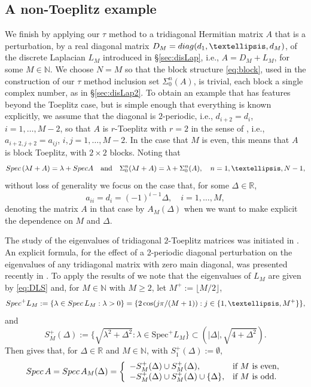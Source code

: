 \documentclass[preprint,1p,11pt]{elsarticle}
\newcommand\N{{\mathbb N}}
\newcommand\R{{\mathbb R}}
\newcommand\Spec{{\rm Spec}\,}  %
\newcommand\Specn{{\rm Spec}}   %
\newcommand\diag{{\rm diag}}
\numberwithin{equation}{section}   %
\numberwithin{figure}{section}  %
\begin{document}
\subsection{A non-Toeplitz example} \label{sec:2T}
We finish by applying our $\tau$ method to a tridiagonal Hermitian matrix $A$ that is a perturbation, by a real diagonal matrix $D_M= \diag(d_1,\ldots,d_M)$, of the discrete Laplacian $L_M$ introduced in \S\ref{sec:disLap}, i.e., $A=D_M+L_M$, for some $M\in \N$. We choose $N=M$ so that the block structure \eqref{eq:block}, used in the construction of our $\tau$ method inclusion set $\Sigma_0^n(A)$, is trivial, each block a single complex number, as in \S\ref{sec:disLap2}. To obtain an example that has features beyond the Toeplitz case, but is simple enough that everything is known explicitly, we assume that the diagonal is $2$-periodic, i.e., $d_{i+2}=d_i$, $i=1,\ldots,M-2$, so that $A$ is $r$-Toeplitz with $r=2$ in the sense of \cite{GoverBarnett85}, i.e., $a_{i+2,j+2}=a_{ij}$, $i,j=1,\ldots,M-2$. In the case that $M$ is even, this means that $A$ is block Toeplitz, with $2\times 2$ blocks. Noting that 
$$
\Spec(\lambda I + A) = \lambda + \Specn A \quad  \mbox{and} \quad \Sigma_0^n(\lambda I + A) = \lambda + \Sigma_0^n(A), \quad n=1,\ldots, N-1,
$$ 
without loss of generality we focus on the case that, for some $\Delta\in \R$, 
$$
a_{ii}=d_i = (-1)^{i-1}\Delta, \quad i=1,\ldots,M,
$$
denoting the matrix $A$ in that case by $A_M(\Delta)$ when we want to make explicit the dependence on $M$ and $\Delta$.

The study of the eigenvalues of tridiagonal $2$-Toeplitz matrices was initiated in \cite{Gover94}. An explicit formula, for the effect of a 2-periodic diagonal perturbation on the eigenvalues of any tridiagonal matrix with zero main diagonal, was presented recently in \cite{DyachenkoTyaglov24}. To apply the results of \cite{DyachenkoTyaglov24} we note that the eigenvalues of $L_M$ are given by \eqref{eq:DLS} and, for $M\in \N$ with $M\geq 2$, let $M^+:=\lfloor M/2\rfloor$,
$$
\Specn^+ L_M := \{\lambda\in \Spec L_M:\lambda>0\}=\{2 \cos(j\pi/(
M+ 1)) : j \in \{1, \ldots, M^+\}\},
$$
and
\begin{equation} \label{eq:SN+}
S_M^+(\Delta):= \{\sqrt{\lambda^2+\Delta^2}:\lambda\in \mathrm{Spec}^+L_M \}\subset \left(|\Delta|,\sqrt{4+\Delta^2}\right).
\end{equation}
Then  \cite[Theorem 3.1]{DyachenkoTyaglov24} gives that, for $\Delta\in \R$ and $M\in \N$, with $S^+_1(\Delta):= \emptyset$,
\begin{equation} \label{eq:spec2p}
\Spec A = \Spec A_M(\Delta) = \left\{\begin{array}{ll}-S^+_M(\Delta) \cup S^+_M(\Delta), & \mbox{if $M$ is even},\\
-S^+_M(\Delta)\cup S^+_M(\Delta) \cup\{\Delta\}, & \mbox{if $M$ is odd}.\end{array}\right.
\end{equation}
\end{document}
